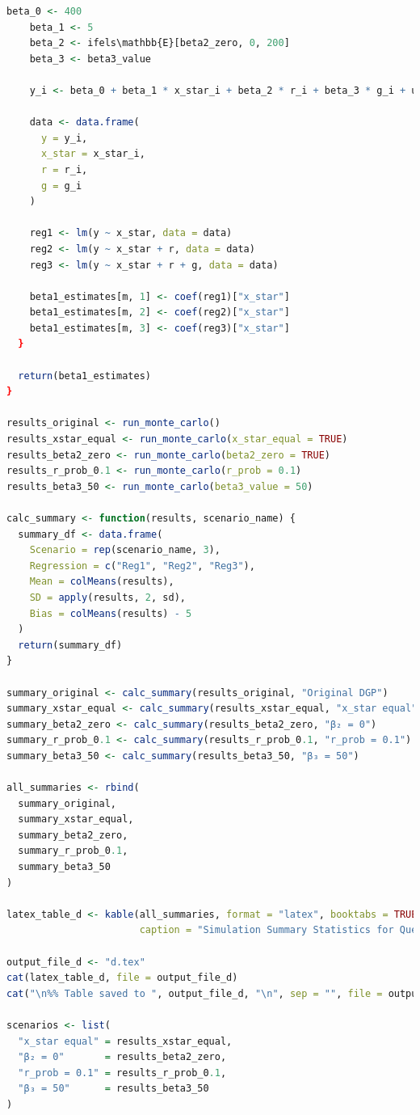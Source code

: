 \documentclass[a4paper,12pt]{article} %
\theoremstyle{nonitalic}
\newenvironment{solution}[1]
  {\renewcommand\theinnercustomsol{#1}\innercustomsol}
  {\endinnercustomsol}
\newcounter{solutionctr}
\renewcommand{\thesolutionctr}{(\alph{solutionctr})}
\newenvironment{autosolution}
  {\stepcounter{solutionctr}\begin{solution}{\thesolutionctr}}
  {\end{solution}}
\begin{document}
\begin{autosolution}
\begin{lstlisting}[language=R]
    beta_0 <- 400
    beta_1 <- 5
    beta_2 <- ifels\mathbb{E}[beta2_zero, 0, 200]
    beta_3 <- beta3_value

    y_i <- beta_0 + beta_1 * x_star_i + beta_2 * r_i + beta_3 * g_i + u_i
    
    data <- data.frame(
      y = y_i,
      x_star = x_star_i,
      r = r_i,
      g = g_i
    )
    
    reg1 <- lm(y ~ x_star, data = data)
    reg2 <- lm(y ~ x_star + r, data = data)
    reg3 <- lm(y ~ x_star + r + g, data = data)
    
    beta1_estimates[m, 1] <- coef(reg1)["x_star"]
    beta1_estimates[m, 2] <- coef(reg2)["x_star"]
    beta1_estimates[m, 3] <- coef(reg3)["x_star"]
  }
    
  return(beta1_estimates)
}
  
results_original <- run_monte_carlo()
results_xstar_equal <- run_monte_carlo(x_star_equal = TRUE)
results_beta2_zero <- run_monte_carlo(beta2_zero = TRUE)
results_r_prob_0.1 <- run_monte_carlo(r_prob = 0.1)
results_beta3_50 <- run_monte_carlo(beta3_value = 50)

calc_summary <- function(results, scenario_name) {
  summary_df <- data.frame(
    Scenario = rep(scenario_name, 3),
    Regression = c("Reg1", "Reg2", "Reg3"),
    Mean = colMeans(results),
    SD = apply(results, 2, sd),
    Bias = colMeans(results) - 5
  )
  return(summary_df)
}
  
summary_original <- calc_summary(results_original, "Original DGP")
summary_xstar_equal <- calc_summary(results_xstar_equal, "x_star equal")
summary_beta2_zero <- calc_summary(results_beta2_zero, "β₂ = 0")
summary_r_prob_0.1 <- calc_summary(results_r_prob_0.1, "r_prob = 0.1")
summary_beta3_50 <- calc_summary(results_beta3_50, "β₃ = 50")

all_summaries <- rbind(
  summary_original,
  summary_xstar_equal,
  summary_beta2_zero,
  summary_r_prob_0.1,
  summary_beta3_50
)
  
latex_table_d <- kable(all_summaries, format = "latex", booktabs = TRUE,
                       caption = "Simulation Summary Statistics for Question (d)")
  
output_file_d <- "d.tex"
cat(latex_table_d, file = output_file_d)
cat("\n%% Table saved to ", output_file_d, "\n", sep = "", file = output_file_d, append = TRUE)

scenarios <- list(
  "x_star equal" = results_xstar_equal,
  "β₂ = 0"       = results_beta2_zero,
  "r_prob = 0.1" = results_r_prob_0.1,
  "β₃ = 50"      = results_beta3_50
)


\end{lstlisting}
\end{autosolution}
\end{document}
